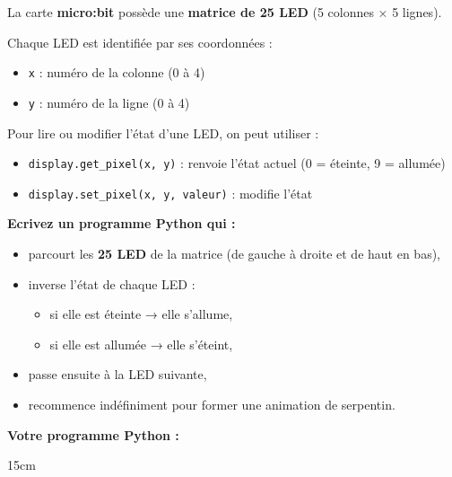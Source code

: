 \documentclass[11pt,a4paper]{exam}
\begin{document}
La carte \textbf{micro:bit} possède une \textbf{matrice de 25 LED} (5 colonnes × 5 lignes).  

Chaque LED est identifiée par ses coordonnées :

\begin{itemize}
    \item \texttt{x} : numéro de la colonne (0 à 4)
    \item \texttt{y} : numéro de la ligne (0 à 4)
\end{itemize}

Pour lire ou modifier l'état d'une LED, on peut utiliser :

\begin{itemize}
    \item \verb|display.get_pixel(x, y)| : renvoie l'état actuel (0 = éteinte, 9 = allumée)
    \item \verb|display.set_pixel(x, y, valeur)| : modifie l'état
\end{itemize}

\begin{questions}

\question[5] \textbf{Ecrivez un programme Python qui :}
\begin{itemize}
    \item parcourt les \textbf{25 LED} de la matrice (de gauche à droite et de haut en bas),
    \item inverse l'état de chaque LED :
    \begin{itemize}
        \item si elle est éteinte → elle s'allume,
        \item si elle est allumée → elle s'éteint,
    \end{itemize}
    \item passe ensuite à la LED suivante,
    \item recommence indéfiniment pour former une animation de serpentin.
\end{itemize}

\vspace{0.5cm}
\noindent\textbf{Votre programme Python :}

\begin{solutionbox}{15cm}
\end{solutionbox}

\end{questions}
\end{document}

